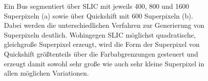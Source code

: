 \begin{figure}[t]
\centering
{}
  \caption[\gls{SLIC} und Quickshift Beispielresultat]{Ein Bus segmentiert über \gls{SLIC} mit jeweils 400, 800 und 1600 Superpixeln (a) sowie über Quickshift mit 600 Superpixeln (b).
  Dabei werden die unterschiedlichen Verfahren zur Generierung von Superpixeln deutlich.
  Wohingegen \gls{SLIC} möglichst quadratische, gleichgroße Superpixel erzeugt, wird die Form der Superpixel von Quickshift größtenteils über die Farbabgrenzungen gesteuert und erzeugt damit sowohl sehr große wie auch sehr kleine Superpixel in allen möglichen Variationen.}
\label{fig:slic_quickshift}
\end{figure}
